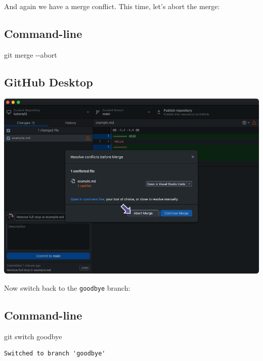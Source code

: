 \documentclass[
  letterpaper,
  DIV=11,
  numbers=noendperiod]{scrartcl}
\newenvironment{Shaded}{\begin{snugshade}}{\end{snugshade}}
\newcommand{\ControlFlowTok}[1]{\textcolor[rgb]{0.00,0.23,0.31}{#1}}
\newcommand{\NormalTok}[1]{\textcolor[rgb]{0.00,0.23,0.31}{#1}}
\newcommand{\SpecialCharTok}[1]{\textcolor[rgb]{0.37,0.37,0.37}{#1}}
\begin{document}
And again we have a merge conflict. This time, let's abort the merge:

\subsection{Command-line}

\begin{Shaded}
\begin{Highlighting}[]
\NormalTok{git merge }\SpecialCharTok{{-}{-}}\NormalTok{abort}
\end{Highlighting}
\end{Shaded}

\subsection{GitHub Desktop}

\includegraphics{images/image64.png}

Now switch back to the \texttt{goodbye} branch:

\subsection{Command-line}

\begin{Shaded}
\begin{Highlighting}[]
\NormalTok{git }\ControlFlowTok{switch}\NormalTok{ goodbye}
\end{Highlighting}
\end{Shaded}

\begin{verbatim}
Switched to branch 'goodbye'
\end{verbatim}
\end{document}
